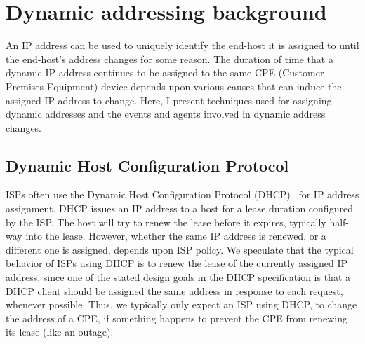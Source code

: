 
\section{Dynamic addressing background}



An IP address can be used to uniquely identify the end-host it is assigned to
until the end-host's address changes for some reason. The duration of
time that a dynamic IP address continues to be assigned to the same
CPE (Customer Premises Equipment) device depends upon various causes that can induce the assigned IP
address to change. Here, I present techniques used for
assigning dynamic addresses and the events and
agents involved in dynamic address changes.


\subsection{Dynamic Host Configuration Protocol}

ISPs often use the Dynamic Host Configuration Protocol
(DHCP)~\cite{rfc2131} for IP address assignment. DHCP issues an IP address to a host for a lease
duration configured by the ISP. The host will try to renew the lease
before it expires, typically half-way into the lease. However,
whether the same IP address is renewed, or a different one is
assigned, depends upon ISP policy.  We speculate that the
typical behavior of ISPs using DHCP is to renew the lease of the
currently assigned IP address, since one of the stated design goals
in the DHCP specification is that a DHCP client should be assigned the same address
in response to each request, whenever possible. Thus, we typically
only expect an ISP using DHCP, to change the address of a CPE, if
something happens to prevent the CPE from renewing its lease (like an outage).

